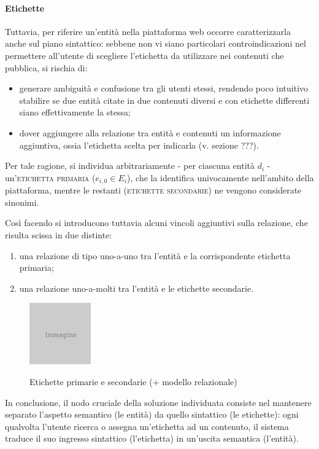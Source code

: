 \paragraph{Etichette}
Tuttavia, per riferire un'entità nella piattaforma web occorre caratterizzarla anche sul piano sintattico: sebbene non vi siano particolari controindicazioni nel permettere all'utente di scegliere l'etichetta da utilizzare nei contenuti che pubblica, si rischia di:
\begin{itemize}
	\item generare ambiguità e confusione tra gli utenti stessi, rendendo poco intuitivo stabilire se due entità citate in due contenuti diversi e con etichette differenti siano effettivamente la stessa;
	\item dover aggiungere alla relazione tra entità e contenuti un informazione aggiuntiva, ossia l'etichetta scelta per indicarla (v. sezione ???).
\end{itemize}

Per tale ragione, si individua arbitrariamente - per ciascuna entità $d_i$ - un'\textsc{etichetta primaria} ($e_{i,0} \in E_i$), che la identifica univocamente nell'ambito della piattaforma, mentre le restanti (\textsc{etichette secondarie}) ne vengono considerate sinonimi.

Così facendo si introducono tuttavia alcuni vincoli aggiuntivi sulla relazione, che risulta scissa in due distinte:
\begin{enumerate}
	\item una relazione di tipo uno-a-uno tra l'entità e la corrispondente etichetta primaria;
	\item una relazione uno-a-molti tra l'entità e le etichette secondarie.
\end{enumerate}

\begin{figure}[ht]
	\begin{center}
		\includegraphics{placeholder.png}
		\label{fig:tesi:stage:fase-uno:entita-sintassi-semantica}
		\caption{Etichette primarie e secondarie (+ modello relazionale)}
	\end{center}
\end{figure}

In conclusione, il nodo cruciale della soluzione individuata consiste nel mantenere separato l'aspetto semantico (le entità) da quello sintattico (le etichette): ogni qualvolta l'utente ricerca o assegna un'etichetta ad un contenuto, il sistema traduce il suo ingresso sintattico (l'etichetta) in un'uscita semantica (l'entità).

